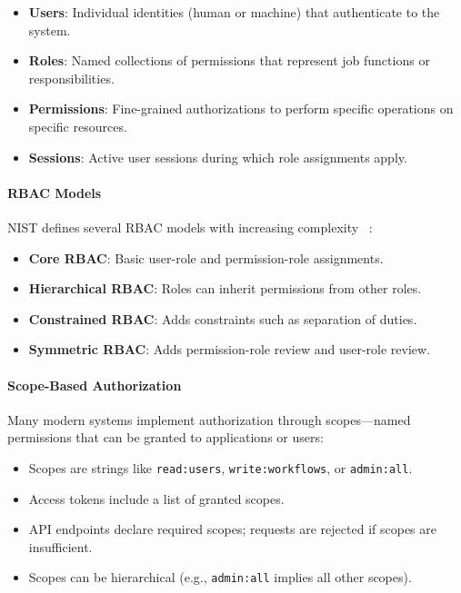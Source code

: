 \begin{itemize}
    \item \textbf{Users}: Individual identities (human or machine) that authenticate to the system.
    \item \textbf{Roles}: Named collections of permissions that represent job functions or responsibilities.
    \item \textbf{Permissions}: Fine-grained authorizations to perform specific operations on specific resources.
    \item \textbf{Sessions}: Active user sessions during which role assignments apply.
\end{itemize}

\paragraph{RBAC Models}

NIST defines several RBAC models with increasing complexity~%
:

\begin{itemize}
    \item \textbf{Core RBAC}: Basic user-role and permission-role assignments.
    \item \textbf{Hierarchical RBAC}: Roles can inherit permissions from other roles.
    \item \textbf{Constrained RBAC}: Adds constraints such as separation of duties.
    \item \textbf{Symmetric RBAC}: Adds permission-role review and user-role review.
\end{itemize}

\paragraph{Scope-Based Authorization}

Many modern systems implement authorization through scopes---named permissions that can be granted to applications or users:

\begin{itemize}
    \item Scopes are strings like \texttt{read:users}, \texttt{write:workflows}, or \texttt{admin:all}.
    \item Access tokens include a list of granted scopes.
    \item API endpoints declare required scopes; requests are rejected if scopes are insufficient.
    \item Scopes can be hierarchical (e.g., \texttt{admin:all} implies all other scopes).
\end{itemize}

